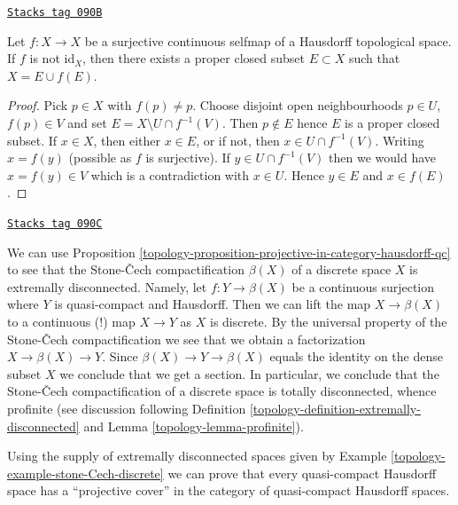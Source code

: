 \begin{lemma}[Rainwater]
\label{topology-lemma-rainwater}
\href{https://stacks.math.columbia.edu/tag/090B}{\texttt{Stacks tag 090B}}

Let $f : X \to X$ be a surjective continuous selfmap of a Hausdorff
topological space. If $f$ is not $\text{id}_X$, then there exists a
proper closed subset $E \subset X$ such that $X = E \cup f(E)$.
\end{lemma}

\begin{proof}
Pick $p \in X$ with $f(p) \not = p$. Choose disjoint open neighbourhoods
$p \in U$, $f(p) \in V$ and set $E = X \setminus U \cap f^{-1}(V)$.
Then $p \not \in E$ hence $E$ is a proper closed subset.
If $x \in X$, then either $x \in E$, or if not, then $x \in U \cap f^{-1}(V)$.
Writing $x = f(y)$ (possible as $f$ is surjective). If $y \in U \cap f^{-1}(V)$
then we would have $x = f(y) \in V$ which is a contradiction with
$x \in U$. Hence $y \in E$ and $x \in f(E)$.
\end{proof}

\begin{example}
\label{topology-example-stone-Cech-discrete}
\href{https://stacks.math.columbia.edu/tag/090C}{\texttt{Stacks tag 090C}}

We can use Proposition \ref{topology-proposition-projective-in-category-hausdorff-qc}
to see that the Stone-{\v C}ech compactification $\beta(X)$ of a discrete
space $X$ is extremally disconnected. Namely, let $f : Y \to \beta(X)$ be
a continuous surjection where $Y$ is quasi-compact and Hausdorff. Then
we can lift the map $X \to \beta(X)$ to a continuous (!) map
$X \to Y$ as $X$ is discrete. By the universal property of the
Stone-{\v C}ech compactification we see that we obtain a factorization
$X \to \beta(X) \to Y$. Since $\beta(X) \to Y \to \beta(X)$ equals
the identity on the dense subset $X$ we conclude that we get a section.
In particular, we conclude that the Stone-{\v C}ech compactification
of a discrete space is totally disconnected, whence profinite
(see discussion following
Definition \ref{topology-definition-extremally-disconnected} and
Lemma \ref{topology-lemma-profinite}).
\end{example}

Using the supply of extremally disconnected spaces given by
Example \ref{topology-example-stone-Cech-discrete}
we can prove that every quasi-compact Hausdorff space has a
``projective cover'' in the category of quasi-compact Hausdorff spaces.


